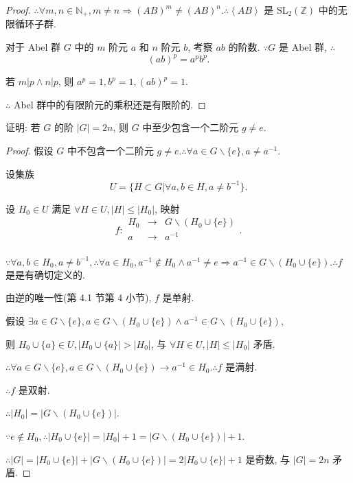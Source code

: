 \documentclass[color=black,device=normal,lang=cn,mode=geye]{elegantnote}
\begin{document}
\begin{proof}
    $\therefore\forall m,n\in\mathbb{N}_+,m\neq n\Rightarrow(AB)^m\neq(AB)^n.\therefore\left<AB\right>$ 是 $\mathrm{SL}_2(\mathbb{Z})$ 中的无限循环子群.
    
    对于 Abel 群 $G$ 中的 $m$ 阶元 $a$ 和 $n$ 阶元 $b$, 考察 $ab$ 的阶数. $\because G$ 是 Abel 群, $\therefore$
    \[(ab)^p=a^pb^p.\]
    
    若 $m|p\land n|p$, 则 $a^p=1,b^p=1,(ab)^p=1$.
    
    $\therefore$ Abel 群中的有限阶元的乘积还是有限阶的.
\end{proof}
\begin{exercise}%
    证明: 若 $G$ 的阶 $|G|=2n$, 则 $G$ 中至少包含一个二阶元 $g\neq e$.
\end{exercise}
\begin{proof}
    假设 $G$ 中不包含一个二阶元 $g\neq e.\therefore\forall a\in G\backslash\{e\},a\neq a^{-1}$.

    设集族
    \[U=\{H\subset G|\forall a,b\in H,a\neq b^{-1}\}.\]

    设 $H_0\in U$ 满足 $\forall H\in U,|H|\leq|H_0|$, 映射
    \[f:\begin{array}{rcl}
        H_0 & \to & G\backslash(H_0\cup\{e\}) \\
        a & \to & a^{-1} \\
    \end{array}.\]

    $\because\forall a,b\in H_0,a\neq b^{-1},\therefore\forall a\in H_0,a^{-1}\notin H_0\land a^{-1}\neq e\Rightarrow a^{-1}\in G\backslash(H_0\cup\{e\}).\therefore f$ 是是有确切定义的.

    由逆的唯一性(第 4.1 节第 4 小节), $f$ 是单射.

    假设 $\exists a\in G\backslash\{e\},a\in G\backslash(H_0\cup\{e\})\land a^{-1}\in G\backslash(H_0\cup\{e\})$,

    则 $H_0\cup\{a\}\in U,|H_0\cup\{a\}|>|H_0|$, 与 $\forall H\in U,|H|\leq|H_0|$ 矛盾.

    $\therefore\forall a\in G\backslash\{e\},a\in G\backslash(H_0\cup\{e\})\to a^{-1}\in H_0.\therefore f$ 是满射.

    $\therefore f$ 是双射.

    $\therefore|H_0|=|G\backslash(H_0\cup\{e\})|$.

    $\because e\notin H_0,\therefore|H_0\cup\{e\}|=|H_0|+1=|G\backslash(H_0\cup\{e\})|+1$.

    $\therefore|G|=|H_0\cup\{e\}|+|G\backslash(H_0\cup\{e\})|=2|H_0\cup\{e\}|+1$ 是奇数, 与 $|G|=2n$ 矛盾.
\end{proof}
\end{document}

